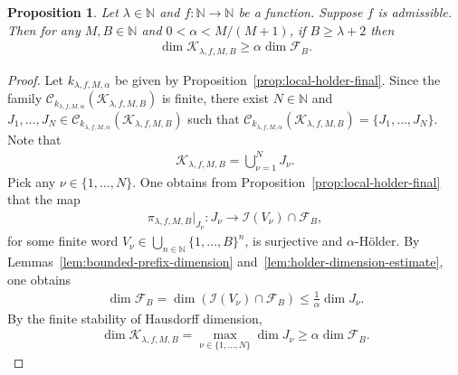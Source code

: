 \documentclass[12pt,reqno]{amsart}
\theoremstyle{definition}
\theoremstyle{plain}
\newtheorem{prop}{Proposition}
\begin{document}
\begin{prop}
\label{prop:dimension-lower-final}
Let $\lambda\in\mathbb{N}$ and $f:\mathbb{N}\to\mathbb{N}$ be a function. Suppose $f$ is admissible. Then for any $M,B\in\mathbb{N}$ and $0<\alpha<M/(M+1)$, if $B\geq \lambda+2$ then
\begin{align*}
    \dim{\mathcal{K}_{\lambda,f,M,B}}
    \geq \alpha\dim{\mathcal{F}_B}.
\end{align*}
\end{prop}
\begin{proof}
Let $k_{\lambda,f,M,\alpha}$ be given by Proposition~\ref{prop:local-holder-final}. Since the family $\mathscr{C}_{k_{\lambda,f,M,\alpha}}(\mathcal{K}_{\lambda,f,M,B})$ is finite, there exist $N\in\mathbb{N}$ and $J_1,\dots,J_N\in\mathscr{C}_{k_{\lambda,f,M,\alpha}}(\mathcal{K}_{\lambda,f,M,B})$ such that $\mathscr{C}_{k_{\lambda,f,M,\alpha}}(\mathcal{K}_{\lambda,f,M,B})=\{J_1,\dots,J_N\}$. Note that
\begin{align*}
    \mathcal{K}_{\lambda,f,M,B}=\bigcup_{\nu=1}^N J_\nu.
\end{align*}
Pick any $\nu\in\{1,\ldots,N\}$. One obtains from Proposition~\ref{prop:local-holder-final} that the map
\begin{align*}
    \pi_{\lambda,f,M,B}|_{J_\nu}:
    J_\nu\to \mathcal{I}\!\left(V_\nu\right)\cap \mathcal{F}_B,
\end{align*}
for some finite word $V_\nu\in\bigcup_{n\in\mathbb{N}}\{1,\ldots,B\}^n$, is surjective and $\alpha$-H\"older. By Lemmas~\ref{lem:bounded-prefix-dimension} and~\ref{lem:holder-dimension-estimate}, one obtains
\begin{align*}
    \dim{\mathcal{F}_B}
    =\dim{\left(\mathcal{I}\!\left(V_\nu\right)\cap \mathcal{F}_B\right)}
    \leq\frac{1}{\alpha}\dim{J_\nu}.
\end{align*}
By the finite stability of Hausdorff dimension, 
\begin{align*}
    \dim{\mathcal{K}_{\lambda,f,M,B}}
    = \max_{\nu\in\{1,\ldots,N\}}\dim{J_\nu}
    \geq \alpha\dim{\mathcal{F}_B}.
\end{align*}
\end{proof}
\end{document}
